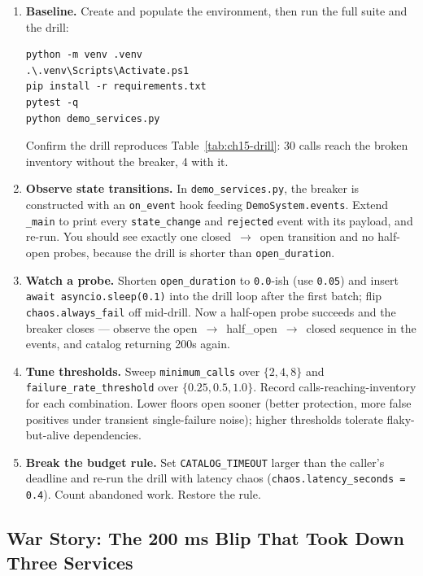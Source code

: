\begin{enumerate}
  \item \textbf{Baseline.} Create and populate the environment, then run
        the full suite and the drill:
\begin{verbatim}
python -m venv .venv
.\.venv\Scripts\Activate.ps1
pip install -r requirements.txt
pytest -q
python demo_services.py
\end{verbatim}
        Confirm the drill reproduces Table~\ref{tab:ch15-drill}: 30 calls
        reach the broken inventory without the breaker, 4 with it.
  \item \textbf{Observe state transitions.} In \texttt{demo\_services.py},
        the breaker is constructed with an \texttt{on\_event} hook feeding
        \texttt{DemoSystem.events}. Extend \texttt{\_main} to print every
        \texttt{state\_change} and \texttt{rejected} event with its
        payload, and re-run. You should see exactly one
        closed~$\to$~open transition and no half-open probes, because the
        drill is shorter than \texttt{open\_duration}.
  \item \textbf{Watch a probe.} Shorten \texttt{open\_duration} to
        \texttt{0.0}-ish (use \texttt{0.05}) and insert
        \texttt{await asyncio.sleep(0.1)} into the drill loop after the
        first batch; flip \texttt{chaos.always\_fail} off mid-drill. Now a
        half-open probe succeeds and the breaker closes --- observe the
        open~$\to$~half\_open~$\to$~closed sequence in the events, and
        catalog returning 200s again.
  \item \textbf{Tune thresholds.} Sweep \texttt{minimum\_calls} over
        $\{2, 4, 8\}$ and \texttt{failure\_rate\_threshold} over
        $\{0.25, 0.5, 1.0\}$. Record calls-reaching-inventory for each
        combination. Lower floors open sooner (better protection, more
        false positives under transient single-failure noise); higher
        thresholds tolerate flaky-but-alive dependencies.
  \item \textbf{Break the budget rule.} Set \texttt{CATALOG\_TIMEOUT}
        larger than the caller's deadline and re-run the drill with
        latency chaos (\texttt{chaos.latency\_seconds = 0.4}). Count
        abandoned work. Restore the rule.
\end{enumerate}

\subsection*{War Story: The 200 ms Blip That Took Down Three Services}

